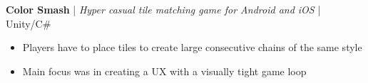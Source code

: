 \textbf{Color Smash} | \textit{Hyper casual tile matching game for Android and iOS} | Unity/C\#
\begin{itemize}
    \item Players have to place tiles to create large consecutive chains of the same style
    \item Main focus was in creating a UX with a visually tight game loop
\end{itemize}
